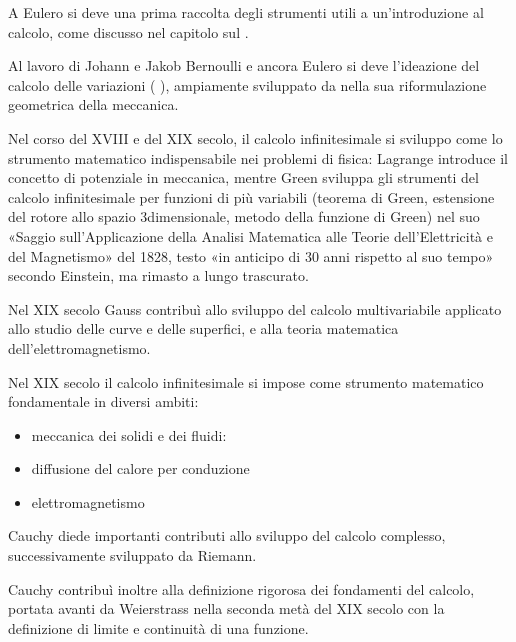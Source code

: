 \documentclass[letterpaper,10pt,italian]{jupyterBook}
\begin{document}
\sphinxAtStartPar
A Eulero si deve una prima raccolta degli strumenti utili a un’introduzione al calcolo, come discusso nel capitolo sul {\hyperref[\detokenize{ch/precalculus:math-hs-precalculus}]{}}.

\sphinxAtStartPar
Al lavoro di Johann e Jakob Bernoulli e ancora Eulero si deve l’ideazione del calcolo delle variazioni ( ), ampiamente sviluppato da  nella sua riformulazione geometrica della meccanica.

\sphinxAtStartPar
Nel corso del XVIII e del XIX secolo, il calcolo infinitesimale si sviluppo come lo strumento matematico indispensabile nei problemi di fisica: Lagrange introduce il concetto di potenziale in meccanica, mentre Green sviluppa gli strumenti del calcolo infinitesimale per funzioni di più variabili (teorema di Green, estensione del rotore allo spazio 3\sphinxhyphen{}dimensionale, metodo della funzione di Green) nel suo «Saggio sull’Applicazione della Analisi Matematica alle Teorie dell’Elettricità e del Magnetismo» del 1828, testo «in anticipo di 30 anni rispetto al suo tempo» secondo Einstein, ma rimasto a lungo trascurato.

\sphinxAtStartPar
Nel XIX secolo Gauss contribuì allo sviluppo del calcolo multivariabile applicato allo studio delle curve e delle superfici, e alla teoria matematica dell’elettromagnetismo.

\sphinxAtStartPar
Nel XIX secolo il calcolo infinitesimale si impose come strumento matematico fondamentale in diversi ambiti:
\begin{itemize}
\item {} 
\sphinxAtStartPar
meccanica dei solidi e dei fluidi:

\item {} 
\sphinxAtStartPar
diffusione del calore per conduzione

\item {} 
\sphinxAtStartPar
elettromagnetismo

\end{itemize}

\sphinxAtStartPar
Cauchy diede importanti contributi allo sviluppo del calcolo complesso, successivamente sviluppato da Riemann.

\sphinxAtStartPar
Cauchy contribuì inoltre alla definizione rigorosa dei fondamenti del calcolo, portata avanti da Weierstrass nella seconda metà del XIX secolo con la definizione di limite e continuità di una funzione.
\end{document}
